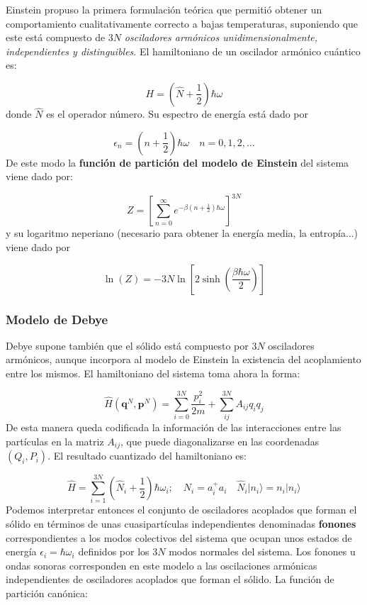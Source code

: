 \documentclass[12pt,a4paper]{article}
\numberwithin{equation}{section}
\numberwithin{figure}{section}
\newcommand{\parentesis}[1]{\left( #1  \right)}
\newcommand{\ccorchetes}[1]{\left[ #1  \right]}
\newcommand{\pn}{\mathbf{p}}
\newcommand{\qn}{\mathbf{q}}
\theoremstyle{definition}
\begin{document}
Einstein propuso la primera formulación teórica que permitió obtener un comportamiento cualitativamente correcto a bajas temperaturas, suponiendo que este está compuesto de $3N$  {\it osciladores armónicos unidimensionalmente, independientes y distinguibles}. El hamiltoniano de un oscilador armónico cuántico es: 

\begin{equation}
H = \parentesis{\hat{N}+ \frac{1}{2}}\hbar \omega
\end{equation}
donde $\hat{N}$ es el operador número. Su espectro de energía está dado por

\begin{equation}
\epsilon_n = \parentesis{n + \frac{1}{2}} \hbar \omega \quad n=0,1,2,...
\end{equation}
De este modo la \textbf{función de partición del modelo de Einstein} del sistema viene dado por: 

\begin{equation}
Z=\ccorchetes{\sum_{n=0}^{\infty} e^{-\beta \parentesis{n+\frac{1}{2} } \hbar \omega }}^{3N} 
\end{equation}
y su logaritmo neperiano (necesario para obtener la energía media, la entropía...) viene dado por

\begin{equation}
\ln (Z) = - 3N \ln \ccorchetes{2\sinh \parentesis{\frac{\beta \hbar \omega}{2}}}
\end{equation}

\subsubsection{Modelo de Debye}

Debye supone también que el sólido está compuesto por $3N$ osciladores armónicos, aunque incorpora al modelo de Einstein la existencia del acoplamiento entre los mismos. El hamiltoniano del sistema toma ahora la forma:

\begin{equation}
\hat{H} (\qn^N,\pn^N) = \sum_{i=0}^{3N} \frac{p_i^2}{2m} + \sum_{ij}^{3N} A_{ij} q_i q_j
\end{equation}
De esta manera queda codificada la información de las interacciones entre las partículas en la matriz $A_{ij}$, que puede diagonalizarse en las coordenadas $(Q_i,P_i)$. El resultado cuantizado del hamiltoniano es:

\begin{equation}
\hat{H} = \sum_{i=1}^{3N} \parentesis{\hat{N}_i+\frac{1}{2}} \hbar \omega_i; \quad N_i = a_i^+ a_i \quad \hat{N}_i |n_i \rangle = n_i |n_i \rangle
\end{equation}
Podemos interpretar entonces el conjunto de osciladores acoplados que forman el sólido en términos de unas cuasipartículas independientes denominadas \textbf{fonones} correspondientes a los modos colectivos del sistema que ocupan unos estados de energía $\epsilon_i = \hbar \omega_i$ definidos por los $3N$ modos normales del sistema. Los fonones u ondas sonoras corresponden en este modelo a las oscilaciones armónicas independientes de osciladores acoplados que forman el sólido. La función de partición canónica:
\end{document}
